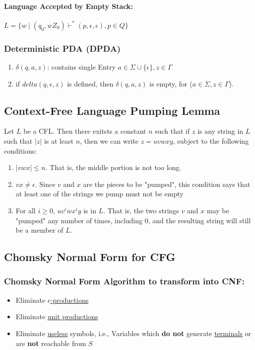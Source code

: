 \documentclass[20pt]{article} %
\begin{document}
\paragraph{Language Accepted by \textbf{Empty Stack}: } $L = \{ w \mid (q_0, w Z_0) \vdash^{*} (p, \epsilon, \epsilon), p \in Q \}$
\subsubsection{Deterministic PDA (DPDA)}
\begin{enumerate}
\item $\delta(q, a, z)$: contains single Entry $a \in \Sigma \cup \{ \epsilon \}, z \in \Gamma$
\item if $delta(q, \epsilon, z)$ is defined, then $\delta(q, a, z)$ is empty, for ($a \in \Sigma, z \in \Gamma$).
\end{enumerate}
\subsection{Context-Free Language Pumping Lemma}
Let $L$ be a CFL. Then there exitsts a constant $n$ such that if $z$ is any string in $L$ such that $|z|$ is at least $n$, then we can write $z = uvwxy$, subject to the following conditions:
\begin{enumerate}
\item $|vwx| \leq n$. That is, the middle portion is not too long.
\item $vx \neq \epsilon$. Since $v$ and $x$ are the pieces to be "pumped", this condition says that at least one of the strings we pump must not be empty
\item For all $i \geq 0$, $uv^{i}wx^{i}y$ is in $L$. That is, the two strings $v$ and $x$ may be "pumped" any number of times, including 0, and the resulting string will still be a member of $L$. 
\end{enumerate}
\subsection{Chomsky Normal Form for CFG}
\subsubsection{\textbf{Chomsky Normal Form} Algorithm to transform into CNF:}
\begin{itemize}
\item Eliminate \underline{$\epsilon$-productions}
\item Eliminate \underline{unit productions}
\item Eliminate \underline{useless} symbols, i.e., Variables which \textbf{do not} generate \underline{terminals} or are \textbf{not} reachable from $S$
\end{itemize}
\end{document}
